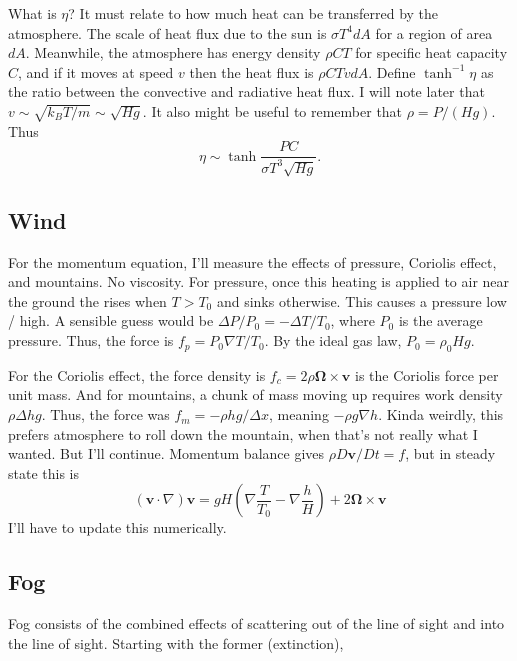 \documentclass[11pt,twocolumn]{article}
\newcommand{\parens}[1]{\left(#1\right)}
\begin{document}
      What is $\eta$? It must relate to how much heat can be transferred by the atmosphere. The scale of heat flux due to the sun is $\sigma T^4 dA$ for a region of area $dA$. Meanwhile, the atmosphere has energy density $\rho CT$ for specific heat capacity $C$, and if it moves at speed $v$ then the heat flux is $\rho CTv dA$. Define $\tanh^{-1} \eta$ as the ratio between the convective and radiative heat flux. I will note later that $v \sim \sqrt{k_B T / m} \sim \sqrt{Hg}$. It also might be useful to remember that $\rho = P/(Hg)$. Thus
      \begin{equation}
        \eta \sim \tanh \frac{P C}{\sigma T^3 \sqrt{H g}}.
      \end{equation}


    \subsection{Wind}
      For the momentum equation, I'll measure the effects of pressure, Coriolis effect, and mountains. No viscosity. For pressure, once this heating is applied to air near the ground the rises when $T > T_0$ and sinks otherwise. This causes a pressure low / high. A sensible guess would be $\Delta P / P_0 = -\Delta T / T_0$, where $P_0$ is the average pressure. Thus, the force is $f_p = P_0 \nabla  T / T_0$. By the ideal gas law, $P_0 = \rho_0 Hg.$
      
      For the Coriolis effect, the force density is $f_c = 2 \rho \bm \Omega \times \bm v$ is the Coriolis force per unit mass. And for mountains, a chunk of mass moving up requires work density $\rho \Delta hg$. Thus, the force was $f_m = -\rho h g / \Delta x$, meaning $-\rho g \nabla h$. Kinda weirdly, this prefers atmosphere to roll down the mountain, when that's not really what I wanted. But I'll continue. Momentum balance gives $\rho D\bm v / Dt = f$, but in steady state this is
      \begin{equation}
        (\bm v \cdot \nabla) \bm v = gH\parens{\nabla \frac{T}{T_0} - \nabla \frac{h}{H}} + 2\bm \Omega \times \bm v
      \end{equation}
      I'll have to update this numerically.

  \subsection{Fog}
    Fog consists of the combined effects of scattering out of the line of sight and into the line of sight. Starting with the former (extinction),
\end{document}
